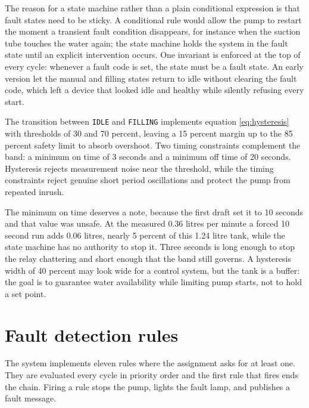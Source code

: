 The reason for a state machine rather than a plain conditional expression is that fault states need to be sticky. A conditional rule would allow the pump to restart the moment a transient fault condition disappears, for instance when the suction tube touches the water again; the state machine holds the system in the fault state until an explicit intervention occurs. One invariant is enforced at the top of every cycle: whenever a fault code is set, the state must be a fault state. An early version let the manual and filling states return to idle without clearing the fault code, which left a device that looked idle and healthy while silently refusing every start.

The transition between \texttt{IDLE} and \texttt{FILLING} implements equation \eqref{eq:hysteresis} with thresholds of 30 and 70 percent, leaving a 15 percent margin up to the 85 percent safety limit to absorb overshoot. Two timing constraints complement the band: a minimum on time of 3 seconds and a minimum off time of 20 seconds. Hysteresis rejects measurement noise near the threshold, while the timing constraints reject genuine short period oscillations and protect the pump from repeated inrush.

The minimum on time deserves a note, because the first draft set it to 10 seconds and that value was unsafe. At the measured 0.36 litres per minute a forced 10 second run adds 0.06 litres, nearly 5 percent of this 1.24 litre tank, while the state machine has no authority to stop it. Three seconds is long enough to stop the relay chattering and short enough that the band still governs. A hysteresis width of 40 percent may look wide for a control system, but the tank is a buffer: the goal is to guarantee water availability while limiting pump starts, not to hold a set point.

\section{Fault detection rules}
\label{sec:o6-4}

The system implements eleven rules where the assignment asks for at least one. They are evaluated every cycle in priority order and the first rule that fires ends the chain. Firing a rule stops the pump, lights the fault lamp, and publishes a fault message.

